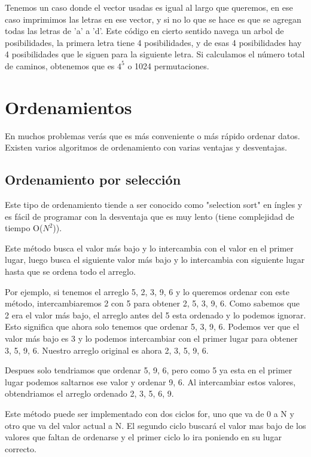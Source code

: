 \documentclass{article}
\begin{document}
Tenemos un caso donde el vector usadas es igual al largo que queremos, en ese caso imprimimos las letras en ese vector, y si no lo que se hace es que se agregan todas las letras de 'a' a 'd'. Este código en cierto sentido navega un arbol de posibilidades, la primera letra tiene 4 posibilidades, y de esas 4 posibilidades hay 4 posibilidades que le siguen para la siguiente letra. Si calculamos el número total de caminos, obtenemos que es $4^5$ o 1024 permutaciones.

\section{Ordenamientos}

En muchos problemas verás que es más conveniente o más rápido ordenar datos. Existen varios algoritmos de ordenamiento con varias ventajas y desventajas.

\subsection{Ordenamiento por selección}

Este tipo de ordenamiento tiende a ser conocido como "selection sort" en íngles y es fácil de programar con la desventaja que es muy lento (tiene complejidad de tiempo O($N^2$)).

Este método busca el valor más bajo y lo intercambia con el valor en el primer lugar, luego busca el siguiente valor más bajo y lo intercambia con siguiente lugar hasta que se ordena todo el arreglo.

Por ejemplo, si tenemos el arreglo {5, 2, 3, 9, 6} y lo queremos ordenar con este método, intercambiaremos 2 con 5 para obtener {2, 5, 3, 9, 6}. Como sabemos que 2 era el valor más bajo, el arreglo antes del 5 esta ordenado y lo podemos ignorar. Esto significa que ahora solo tenemos que ordenar {5, 3, 9, 6}. Podemos ver que el valor más bajo es 3 y lo podemos intercambiar con el primer lugar para obtener {3, 5, 9, 6}. Nuestro arreglo original es ahora {2, 3, 5, 9, 6}.

Despues solo tendriamos que ordenar {5, 9, 6}, pero como 5 ya esta en el primer lugar podemos saltarnos ese valor y ordenar {9, 6}. Al intercambiar estos valores, obtendriamos el arreglo ordenado {2, 3, 5, 6, 9}.

Este método puede ser implementado con dos ciclos for, uno que va de 0 a N y otro que va del valor actual a N. El segundo ciclo buscará el valor mas bajo de los valores que faltan de ordenarse y el primer ciclo lo ira poniendo en su lugar correcto.
\end{document}

